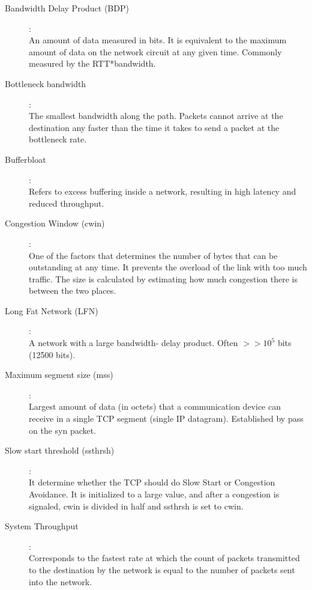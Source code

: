 \begin{description}

\item [Bandwidth Delay Product (BDP)]:\hfill \\  An amount of data measured in
bits. It is equivalent to the maximum amount of data on the network circuit at
any given time. Commonly measured by the RTT*bandwidth.

\item[Bottleneck bandwidth]: \hfill \\  The smallest bandwidth along the path.
Packets cannot arrive at the destination any faster than the time it takes to
send a packet at the bottleneck rate.

\item [Bufferbloat]:\hfill \\  Refers to excess buffering inside a network,
resulting in high latency and reduced throughput.

\item [Congestion Window (cwin)]: \hfill \\  One of the factors that
determines the number of bytes that can be outstanding at any time. It
prevents the overload of the link with too much traffic. The size is
calculated by estimating how much congestion there is between the two places.

\item [Long Fat Network (LFN)]:\hfill \\ A network with a large bandwidth-
delay product. Often $>> 10^5$ bits (12500 bits). 

\item [Maximum segment size (mss)]: \hfill \\  Largest amount of data (in
octets) that a communication device can receive in a single TCP segment
(single IP datagram). Established by pass on the syn packet.

\item [Slow start threshold (ssthrsh)]: \hfill \\  It determine whether the
TCP should do Slow Start or Congestion Avoidance. It is initialized to a large
value, and after a congestion is signaled, cwin is divided in half and ssthrsh
is set to cwin.

\item [System Throughput]:\hfill \\ Corresponds to the fastest rate at which
the count of packets transmitted to the destination by the network is equal to
the number of packets sent into the network.

\end{description}
